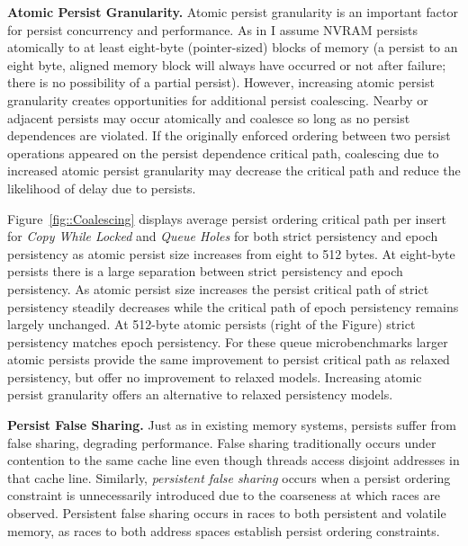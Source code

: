 \textbf{Atomic Persist Granularity.}
Atomic persist granularity is an important factor for persist concurrency and performance.
As in \cite{ConditNightingale09} I assume NVRAM persists atomically to at least eight-byte (pointer-sized) blocks of memory (a persist to an eight byte, aligned memory block will always have occurred or not after failure; there is no possibility of a partial persist).
However, increasing atomic persist granularity creates opportunities for additional persist coalescing.
Nearby or adjacent persists may occur atomically and coalesce so long as no persist dependences are violated.
If the originally enforced ordering between two persist operations appeared on the persist dependence critical path, coalescing due to increased atomic persist granularity may decrease the critical path and reduce the likelihood of delay due to persists.

 

Figure~\ref{fig::Coalescing} displays average persist ordering critical path per insert for \emph{Copy While Locked} and \emph{Queue Holes} for both strict persistency and epoch persistency as atomic persist size increases from eight to 512 bytes.
At eight-byte persists there is a large separation between strict persistency and epoch persistency.
As atomic persist size increases the persist critical path of strict persistency steadily decreases while the critical path of epoch persistency remains largely unchanged.
At 512-byte atomic persists (right of the Figure) strict persistency matches epoch persistency.
For these queue microbenchmarks larger atomic persists provide the same improvement to persist critical path as relaxed persistency, but offer no improvement to relaxed models.
Increasing atomic persist granularity offers an alternative to relaxed persistency models.

\textbf{Persist False Sharing.}
Just as in existing memory systems, persists suffer from false sharing, degrading performance.
False sharing traditionally occurs under contention to the same cache line even though threads access disjoint addresses in that cache line.
Similarly, \emph{persistent false sharing} occurs when a persist ordering constraint is unnecessarily introduced due to the coarseness at which races are observed.
Persistent false sharing occurs in races to both persistent and volatile memory, as races to both address spaces establish persist ordering constraints.

